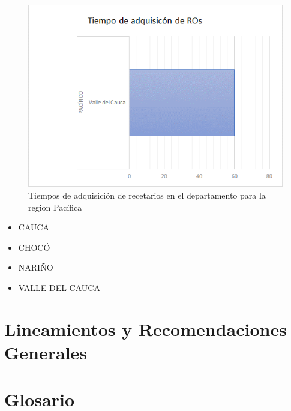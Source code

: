 \documentclass[
]{book}
\providecommand{\tightlist}{%
  \setlength{\itemsep}{0pt}\setlength{\parskip}{0pt}}
\begin{document}
\begin{figure}

{\centering \includegraphics[width=0.5\linewidth]{figures/Imagen41} 

}

\caption{Tiempos de adquisición de recetarios en el departamento para la region Pacífica}\label{fig:tiemposAdquisicionRegionPacifica}
\end{figure}

\begin{itemize}
\tightlist
\item
  CAUCA
\item
  CHOCÓ
\item
  NARIÑO
\item
  VALLE DEL CAUCA
\end{itemize}

\hypertarget{lineamientos-y-recomendaciones-generales}{%
\chapter{Lineamientos y Recomendaciones Generales}\label{lineamientos-y-recomendaciones-generales}}

\hypertarget{glosario}{%
\chapter*{Glosario}\label{glosario}}
\end{document}
